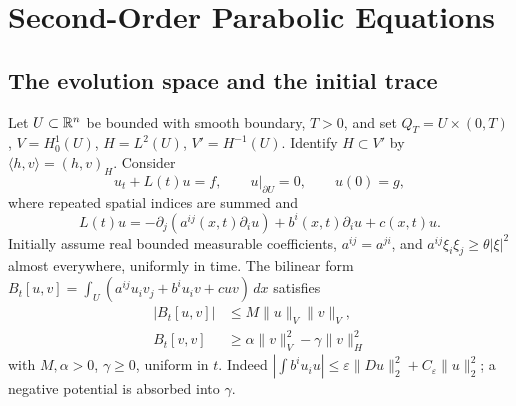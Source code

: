 \Needspace{55mm}
\section{Second-Order Parabolic Equations}
\label{sec:7-1}
\Needspace{55mm}
\subsection{The evolution space and the initial trace}
Let $U\subset\mathbb{R}^n$ be bounded with smooth boundary, $T>0$, and set
$Q_T=U\times(0,T)$, $V=H^1_0(U)$, $H=L^2(U)$, $V'=H^{-1}(U)$.
Identify $H\subset V'$ by $\langle h,v\rangle=(h,v)_H$. Consider
\begin{equation}\label{eq:7-parabolic}
 u_t+L(t)u=f,\qquad u|_{\partial U}=0,\qquad u(0)=g,
\end{equation}
where repeated spatial indices are summed and
\[
 L(t)u=-\partial_j(a^{ij}(x,t)\partial_i u)+b^i(x,t)\partial_i u+c(x,t)u.
\]
Initially assume real bounded measurable coefficients, $a^{ij}=a^{ji}$, and
$a^{ij}\xi_i\xi_j\geq\theta|\xi|^2$ almost everywhere, uniformly in time.
The bilinear form $B_t[u,v]=\int_U(a^{ij}u_i v_j+b^iu_i v+cuv)\,dx$ satisfies
\begin{equation}\label{eq:7-form-bounds}
 \begin{split}
 |B_t[u,v]|&\leq M\|u\|_V\|v\|_V,\\
 B_t[v,v]&\geq\alpha\|v\|_V^2-\gamma\|v\|_H^2
 \end{split}
\end{equation}
with $M,\alpha>0$, $\gamma\geq0$, uniform in $t$.
Indeed $|\int b^iu_i u|\leq\varepsilon\|Du\|_2^2+
C_\varepsilon\|u\|_2^2$; a negative potential is absorbed into $\gamma$.

